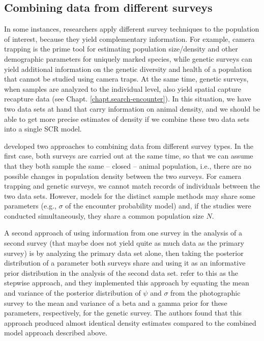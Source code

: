 \subsection{Combining data from different surveys}

In some instances, researchers apply different survey techniques to
the population of interest, because they yield complementary
information. For example, camera trapping is the prime tool for
estimating population size/density and other demographic parameters
for uniquely marked species, while genetic surveys can yield additional
information on the genetic diversity and health of a population that
cannot be studied using camera traps. At the same time, genetic surveys,
when samples are analyzed to the individual level, also yield spatial
capture recapture data (see Chapt. \ref{chapt.search-encounter}). In
this situation, we have two data sets at hand that carry information
on animal density, and we should be able to get more precise estimates
of density if we combine these two data sets into a single SCR model.

\citet{gopalaswamy_etal:2012mee} developed two approaches to combining
data from different survey types. In the first case, both surveys are
carried out at the same time, so that we can assume that they both
sample the same -- closed -- animal population, i.e., there are no
possible changes in population density between the two surveys. For
camera trapping and genetic surveys, we cannot match records of
individuals between the two data sets. However, models for the
distinct sample methods may share some parameters (e.g., $\sigma$ of
the encounter probability model) and, if the studies were conducted
simultaneously, they share a common population size $N$.

A second approach of using information from one survey in the analysis
of a second survey (that maybe does not yield quite as much data as
the primary survey) is by analyzing the %
primary data set alone, then
taking the posterior distribution of a parameter both surveys share
and using it as an informative prior distribution in the analysis of
the second data set. \citet{gopalaswamy_etal:2012mee} refer to this as
the stepwise approach, and they implemented this approach by equating
the mean and variance of the posterior distribution of $\psi$ and
$\sigma$ from the photographic survey to the mean and variance of a
beta and a gamma prior for these parameters, respectively, for the
genetic survey. The authors found that this approach produced almost
identical density estimates compared to the combined model approach
described above.


